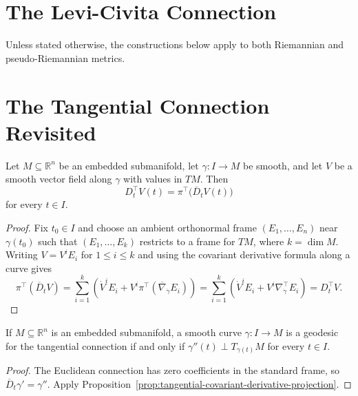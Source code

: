 \section{The Levi-Civita Connection}

Unless stated otherwise, the constructions below apply to both Riemannian and
pseudo-Riemannian metrics.

\section{The Tangential Connection Revisited}

\begin{proposition}
\label{prop:tangential-covariant-derivative-projection}


Let $M \subseteq \mathbb{R}^n$ be an embedded submanifold, let
$\gamma:I\to M$ be smooth, and let $V$ be a smooth vector field along
$\gamma$ with values in $TM$. Then
\[
D_t^\top V(t)=\pi^\top\bigl(\overline D_tV(t)\bigr)
\]
for every $t\in I$.

\begin{proof}
\sketch Fix $t_0\in I$ and choose an ambient orthonormal frame
$(E_1,\ldots,E_n)$ near $\gamma(t_0)$ such that
$(E_1,\ldots,E_k)$ restricts to a frame for $TM$, where $k=\dim M$.
Writing $V=V^iE_i$ for $1\leq i\leq k$ and using the covariant derivative
formula along a curve gives
\[
\pi^\top(\overline D_tV)
=\sum_{i=1}^k\left(\dot V^iE_i+V^i\pi^\top(\overline\nabla_{\dot\gamma}E_i)\right)
=\sum_{i=1}^k\left(\dot V^iE_i+V^i\nabla^\top_{\dot\gamma}E_i\right)
=D_t^\top V.
\]
\end{proof}
\end{proposition}

\begin{corollary}
\label{cor:geodesic-submanifold-acceleration}


If $M\subseteq\mathbb R^n$ is an embedded submanifold, a smooth curve
$\gamma:I\to M$ is a geodesic for the tangential connection if and only if
$\gamma''(t)\perp T_{\gamma(t)}M$ for every $t\in I$.

\begin{proof}
\sketch The Euclidean connection has zero coefficients in the standard frame,
so $\overline D_t\gamma'=\gamma''$. Apply
Proposition~\ref{prop:tangential-covariant-derivative-projection}.
\end{proof}
\end{corollary}

